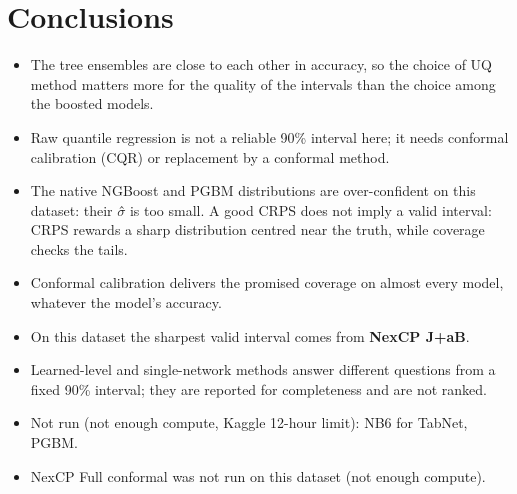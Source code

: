 \documentclass[11pt]{article}
\begin{document}
\section{Conclusions}
\begin{itemize}
\item The tree ensembles are close to each other in accuracy, so the choice of UQ method matters more for the quality of the intervals than the choice among the boosted models.
\item Raw quantile regression is not a reliable 90\% interval here; it needs conformal calibration (CQR) or replacement by a conformal method.
\item The native NGBoost and PGBM distributions are over-confident on this dataset: their $\sigma$̂ is too small. A good CRPS does not imply a valid interval: CRPS rewards a sharp distribution centred near the truth, while coverage checks the tails.
\item Conformal calibration delivers the promised coverage on almost every model, whatever the model's accuracy.
\item On this dataset the sharpest valid interval comes from \textbf{NexCP J+aB}.
\item Learned-level and single-network methods answer different questions from a fixed 90\% interval; they are reported for completeness and are not ranked.
\item Not run (not enough compute, Kaggle 12-hour limit): NB6 for TabNet, PGBM.
\item NexCP Full conformal was not run on this dataset (not enough compute).
\end{itemize}
\end{document}
